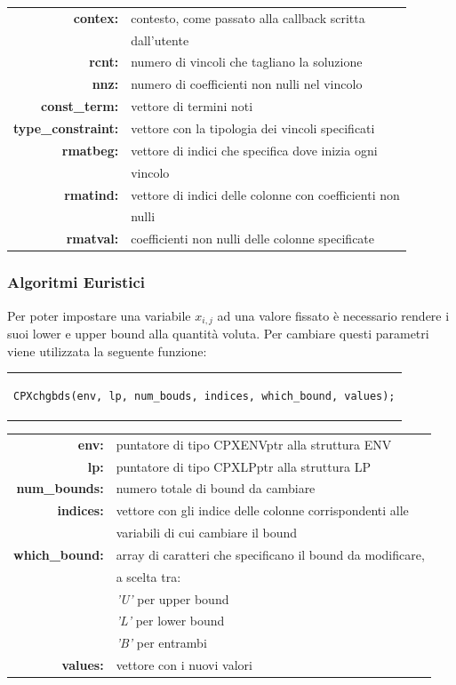\begin{table}[h]
\centering
\begin{tabular}{rl}
\textbf{contex:} & {contesto, come passato alla callback scritta}\\
&{dall'utente}\\
\textbf{rcnt:} & {numero di vincoli che tagliano la soluzione}\\
\textbf{nnz:} & {numero di coefficienti non nulli nel vincolo}\\
\textbf{const\_term:} & {vettore di termini noti}\\
\textbf{type\_constraint:} & {vettore con la tipologia dei vincoli specificati}\\
\textbf{rmatbeg:} & {vettore di indici che specifica dove inizia ogni}\\
&{vincolo}\\
\textbf{rmatind:} & {vettore di indici delle colonne con coefficienti non}\\
&{nulli}\\
\textbf{rmatval:} & {coefficienti non nulli delle colonne specificate}\\
\end{tabular}
\end{table}
\subsubsection{Algoritmi Euristici}
Per poter impostare una variabile $x_{i,j}$ ad una valore fissato è necessario rendere i suoi lower e upper bound alla quantità voluta. Per cambiare questi parametri viene utilizzata la seguente funzione: 
\begin{center}
\begin{tabular}{c}
\begin{lstlisting}[linewidth=365pt, basicstyle=\footnotesize\sffamily,]    
CPXchgbds(env, lp, num_bouds, indices, which_bound, values);
\end{lstlisting}
\end{tabular}
\end{center}
\begin{table}[h]
\centering
\begin{tabular}{rl}
\textbf{env:} & {puntatore di tipo CPXENVptr alla struttura ENV}\\
\textbf{lp:} & {puntatore di tipo CPXLPptr alla struttura LP}\\
\textbf{num\_bounds:} & {numero totale di bound da cambiare}\\
\textbf{indices:} & {vettore con gli indice delle colonne corrispondenti alle}\\
&{variabili di cui cambiare il bound}\\
\textbf{which\_bound:} & {array di caratteri che specificano il bound da modificare,}\\
&{a scelta tra:}\\
&{\textit{'U'} per upper bound}\\
&{\textit{'L'} per lower bound}\\
&{\textit{'B'} per entrambi}\\
\textbf{values:} & {vettore con i nuovi valori}\\
\end{tabular}
\end{table}
